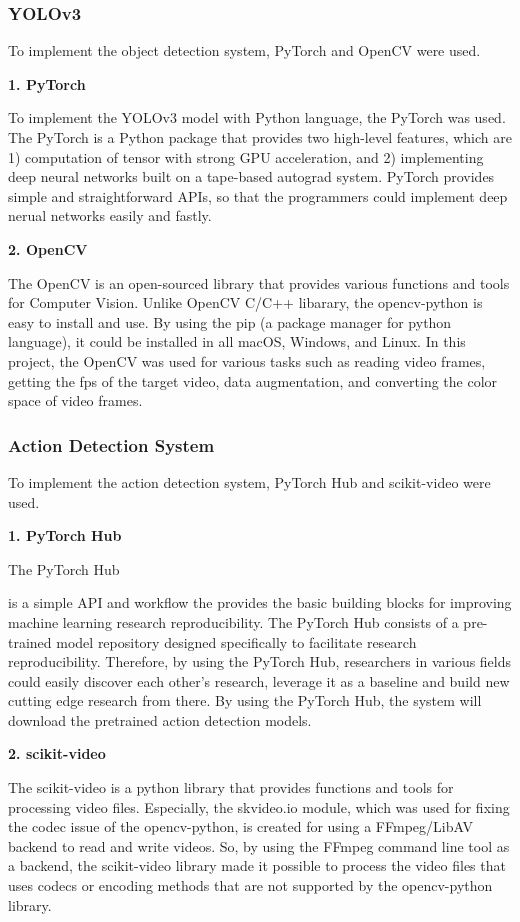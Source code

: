 \documentclass{article}
\begin{document}
\subsubsection{YOLOv3}

To implement the object detection system, PyTorch and OpenCV were used.

\textbf{1. PyTorch}

To implement the YOLOv3 model with Python language, the PyTorch was used. The PyTorch is a Python package that provides two high-level features, which are 1) computation of tensor with strong GPU acceleration, and 2) implementing deep neural networks built on a tape-based autograd system. PyTorch provides simple and straightforward APIs, so that the programmers could implement deep nerual networks easily and fastly.

\textbf{2. OpenCV}

The OpenCV is an open-sourced library that provides various functions and tools for Computer Vision. Unlike OpenCV C/C++ libarary, the opencv-python is easy to install and use. By using the pip (a package manager for python language), it could be installed in all macOS, Windows, and Linux. In this project, the OpenCV was used for various tasks such as reading video frames, getting the fps of the target video, data augmentation, and converting the color space of video frames.

\subsubsection{Action Detection System}

To implement the action detection system, PyTorch Hub and scikit-video were used.

\textbf{1. PyTorch Hub}

\hypertarget{actionDetection_used}{The PyTorch Hub} is a simple API and workflow the provides the basic building blocks for improving machine learning research reproducibility. The PyTorch Hub consists of a pre-trained model repository designed specifically to facilitate research reproducibility.  Therefore, by using the PyTorch Hub, researchers in various fields could easily discover each other’s research, leverage it as a baseline and build new cutting edge research from there. By using the PyTorch Hub, the system will download the pretrained action detection models.

\textbf{2. scikit-video}

The scikit-video is a python library that provides functions and tools for processing video files. Especially, the skvideo.io module, which was used for fixing the codec issue of the opencv-python, is created for using a FFmpeg/LibAV backend to read and write videos. So, by using the FFmpeg command line tool as a backend, the scikit-video library made it possible to process the video files that uses codecs or encoding methods that are not supported by the opencv-python library.
\end{document}
